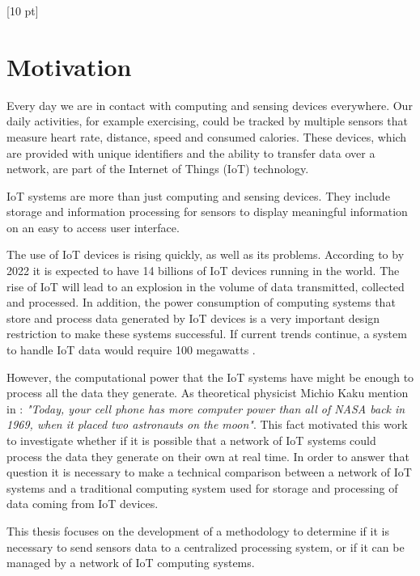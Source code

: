 \titleformat{\chapter}{\Huge\bfseries}{\thechapter}{0 pt}{\rule{340 pt}{3 pt}\\}
\titlespacing{\chapter}{100 pt}{-25 pt}{40 pt}[10 pt]	
\pagestyle{fancy}
\fancyhead[RO,RE]{\thepage}
\fancyfoot[CO,CE]{}

\chapter*{Motivation}

\normalsize
\noindent
Every day we are in contact with computing and sensing devices everywhere. Our
daily activities, for example exercising, could be tracked by multiple sensors
that measure heart rate, distance, speed and consumed calories. These devices,
which are provided with unique identifiers and the ability to transfer data
over a network, are part of the Internet of Things (IoT) technology.

IoT systems are more than just computing and sensing devices. They include
storage and information processing for sensors to display meaningful
information on an easy to access user interface. 

The use of IoT devices is rising quickly, as well as its problems. According to
\cite{Benkhelifa} by 2022 it is expected to have 14 billions of IoT devices
running in the world. The rise of IoT will lead to an explosion in the volume
of data transmitted, collected and processed. In addition, the power
consumption of computing systems that store and process data generated by IoT
devices is a very important design restriction to make these systems
successful. If current trends continue, a system to handle IoT data would
require 100 megawatts \cite{Xizhou}.

However, the computational power that the IoT systems have might be enough to
process all the data they generate. As theoretical physicist Michio Kaku
mention in \cite{Michio}: \textit{"Today, your cell phone has more computer
power than all of NASA back in 1969, when it placed two astronauts on the
moon"}. This fact motivated this work to investigate whether if it is possible
that a network of IoT systems could process the data they generate on their own
at real time. In order to answer that question it is necessary to make a
technical comparison between a network of IoT systems and a traditional
computing system used for storage and processing of data coming from IoT
devices. 

This thesis focuses on the development of a methodology to determine if it is
necessary to send sensors data to a centralized processing system, or if it can
be managed by a network of IoT computing systems. 

\clearpage
